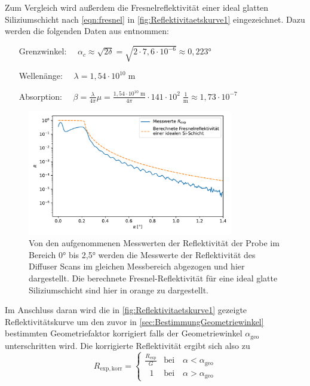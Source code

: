     Zum Vergleich wird außerdem die Fresnelreflektivität einer ideal glatten Siliziumschicht nach \autoref{eqn:fresnel} in \autoref{fig:Reflektivitaetskurve1} eingezeichnet. Dazu werden die folgenden Daten aus \cite{tu_dortmund_versuchsanleitung_2021_e1} entnommen:
    \begin{enumerate}
        \setlength{\itemindent}{70pt}
        \item[Grenzwinkel:] $\quad \alpha_c \approx \sqrt{2 \delta} = \sqrt{2 \cdot 7,6 \cdot 10^{-6}} \approx 0,223°$
        \item[Wellenänge:] $\quad \lambda = 1,54 \cdot 10^{10} \;$m 
        \item[Absorption:] $\quad \beta = \frac{\lambda}{4 \pi} \mu = \frac{1,54 \cdot 10^{10} \; \mathrm{m}}{4 \pi} \cdot 141 \cdot 10^2 \; \frac{1}{\mathrm{m}} \approx 1,73 \cdot 10^{-7}$ 
    \end{enumerate}
    \begin{figure}[ht]
        \centering
        \includegraphics[width = 0.8\textwidth]{plots/Reflektivitaetskurve1.pdf}
        \caption{Von den aufgenommenen Messwerten der Reflektivität der Probe im Bereich 0° bis 2,5° werden die Messwerte der Reflektivität des \glqq Diffuser Scans\grqq{} im gleichen Messbereich abgezogen und hier dargestellt. Die berechnete Fresnel-Reflektivität für eine ideal glatte Siliziumschicht sind hier in orange zu dargestellt.}
        \label{fig:Reflektivitaetskurve1}
    \end{figure}

    Im Anschluss daran wird die in \autoref{fig:Reflektivitaetskurve1} gezeigte Reflektivitätskurve um den zuvor in \autoref{sec:BestimmungGeometriewinkel} bestimmten Geometriefaktor korrigiert falls der Geometriewinkel $\alpha_{\mathrm{geo}}$ unterschritten wird. Die korrigierte Reflektivität ergibt sich also zu
    \begin{equation*}
        R_{\mathrm{exp, korr}} =
        \begin{cases}
            \frac{R_{\mathrm{exp}}}{G} & \mathrm{bei} \quad \alpha < \alpha_{\mathrm{geo}} \\[3pt]
            \hspace{7pt} 1 & \mathrm{bei} \quad \alpha > \alpha_{\mathrm{geo}}
        \end{cases}
    \end{equation*}

